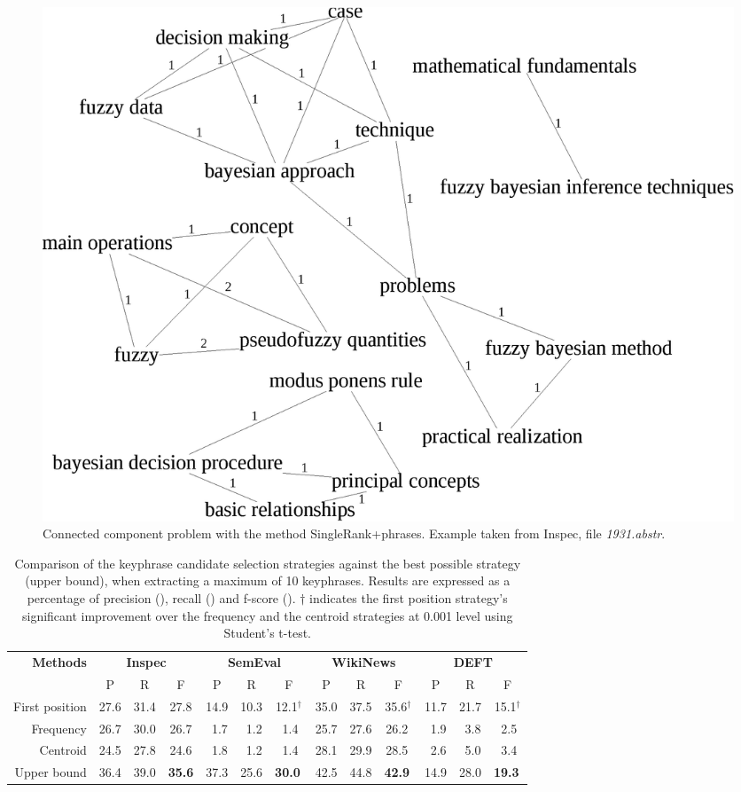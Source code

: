   \begin{figure}[h]
    \centering
    \includegraphics[width=.475\textwidth]{include/1931.eps}
    \caption{Connected component problem with the method SingleRank+phrases.
             Example taken from Inspec, file \textit{1931.abstr}.
             \label{fig:phrases_graph}}
  \end{figure}

  \begin{table}
    \centering
    \begin{tabular}{@{ }rcccccccccccc@{ }}
      \toprule
      \multirow{2}{*}[-2pt]{\textbf{Methods}} & \multicolumn{3}{c}{\textbf{Inspec}} & \multicolumn{3}{c}{\textbf{SemEval}} & \multicolumn{3}{c}{\textbf{WikiNews}} & \multicolumn{3}{c}{\textbf{DEFT}}\\
      \cmidrule(lr){2-4}\cmidrule(lr){5-7}\cmidrule(lr){8-10}\cmidrule(l){11-13}
      & P & R & F & P & R & F & P & R & F & P & R & F\\
      \midrule
      First position & 27.6 & 31.4 & 27.8  & 14.9 & 10.3 & 12.1$^\dagger$ & 35.0 & 37.5 & 35.6$^\dagger$ & 11.7 & 21.7 & 15.1$^\dagger$\\
      Frequency & 26.7 & 30.0 & 26.7 & $~~$1.7 & $~~$1.2 & $~~$1.4$^{~}$ & 25.7 & 27.6 & 26.2$^{~}$ & $~~$1.9 & $~~$3.8 & $~~$2.5$^{~}$\\
      Centroid & 24.5 & 27.8 & 24.6 & $~~$1.8 & $~~$1.2 & $~~$1.4$^{~}$ & 28.1 & 29.9 & 28.5$^{~}$ & $~~$2.6 & $~~$5.0 & $~~$3.4$^{~}$\\
      \midrule
      Upper bound & 36.4 & 39.0 & \textbf{35.6} & 37.3 & 25.6 & \textbf{30.0}$^{~}$ & 42.5 & 44.8 & \textbf{42.9}$^{~}$ & 14.9 & 28.0 & \textbf{19.3}$^{~}$\\
      \bottomrule
    \end{tabular}
    \caption{Comparison of the keyphrase candidate selection strategies against
             the best possible strategy (upper bound), when extracting a maximum
             of 10 keyphrases. Results are expressed as a percentage of
             precision (), recall () and f-score ().
             $\dagger$ indicates the first position strategy's significant
             improvement over the frequency and the centroid strategies at 0.001
             level using Student's t-test.
             \label{tab:cluster_ranking_evaluation}}
  \end{table}
  
